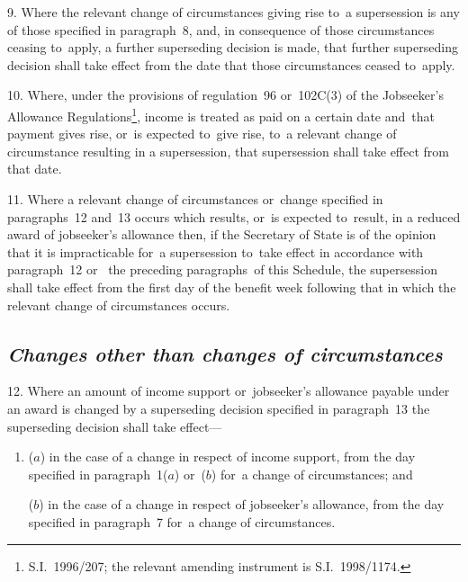 \documentclass[12pt,a4paper]{article}
\begin{document}
\medskip

9.  Where the relevant change of circumstances giving rise to~a supersession is any of those specified in paragraph~8, and, in consequence of those circumstances ceasing to~apply, a further superseding decision is made, that further superseding decision shall take effect from the date that those circumstances ceased to~apply.

\medskip

10.  Where, under the provisions of regulation~96 or~102C(3) of the Jobseeker’s Allowance Regulations\footnote{\frenchspacing S.I.~1996/207; the relevant amending instrument is S.I.~1998/1174.}, income is treated as paid on a certain date and~that payment gives rise, or~is expected to~give rise, to~a relevant change of circumstance resulting in a supersession, that supersession shall take effect from that date.

\medskip

11.  Where a relevant change of circumstances 
or~change specified in paragraphs~12 and~13  %
occurs which results, or~is expected to~result, in a reduced award of jobseeker’s allowance then, if the Secretary of State is of the opinion that it is impracticable for~a supersession to~take effect in accordance with 
paragraph~12 or~%
the preceding paragraphs~of this Schedule, the supersession shall take effect from the first day of the benefit week following that in which the relevant change of circumstances occurs.


\subsection*{\sloppy\itshape Changes other than changes of circumstances}

12.  Where an amount of income support or~jobseeker’s allowance payable under an award is changed by a superseding decision specified in paragraph~13 the superseding decision shall take effect—
\begin{enumerate}\item[]
($a$) in the case of a change in respect of income support, from the day specified in paragraph~1($a$)  or~($b$)  for~a change of circumstances; and

($b$) in the case of a change in respect of jobseeker’s allowance, from the day specified in paragraph~7 for~a change of circumstances.
\end{enumerate}
\end{document}
